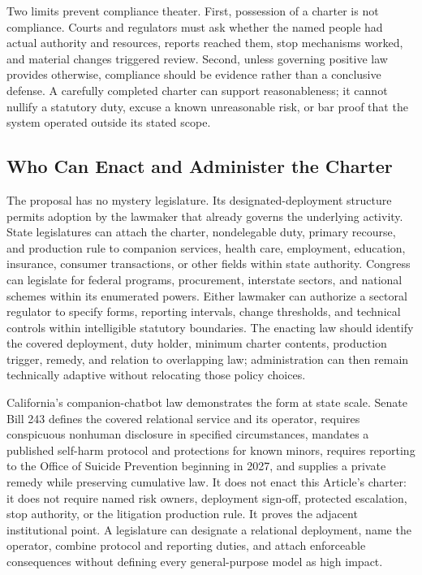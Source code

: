 Two limits prevent compliance theater. First, possession of a charter is not compliance. Courts and regulators must ask whether the named people had actual authority and resources, reports reached them, stop mechanisms worked, and material changes triggered review. Second, unless governing positive law provides otherwise, compliance should be evidence rather than a conclusive defense. A carefully completed charter can support reasonableness; it cannot nullify a statutory duty, excuse a known unreasonable risk, or bar proof that the system operated outside its stated scope.

\subsection{Who Can Enact and Administer the Charter}

The proposal has no mystery legislature. Its designated-deployment structure permits adoption by the lawmaker that already governs the underlying activity. State legislatures can attach the charter, nondelegable duty, primary recourse, and production rule to companion services, health care, employment, education, insurance, consumer transactions, or other fields within state authority. Congress can legislate for federal programs, procurement, interstate sectors, and national schemes within its enumerated powers. Either lawmaker can authorize a sectoral regulator to specify forms, reporting intervals, change thresholds, and technical controls within intelligible statutory boundaries. The enacting law should identify the covered deployment, duty holder, minimum charter contents, production trigger, remedy, and relation to overlapping law; administration can then remain technically adaptive without relocating those policy choices.

California's companion-chatbot law demonstrates the form at state scale. Senate Bill 243 defines the covered relational service and its operator, requires conspicuous nonhuman disclosure in specified circumstances, mandates a published self-harm protocol and protections for known minors, requires reporting to the Office of Suicide Prevention beginning in 2027, and supplies a private remedy while preserving cumulative law. It does not enact this Article's charter: it does not require named risk owners, deployment sign-off, protected escalation, stop authority, or the litigation production rule. It proves the adjacent institutional point. A legislature can designate a relational deployment, name the operator, combine protocol and reporting duties, and attach enforceable consequences without defining every general-purpose model as high impact.

